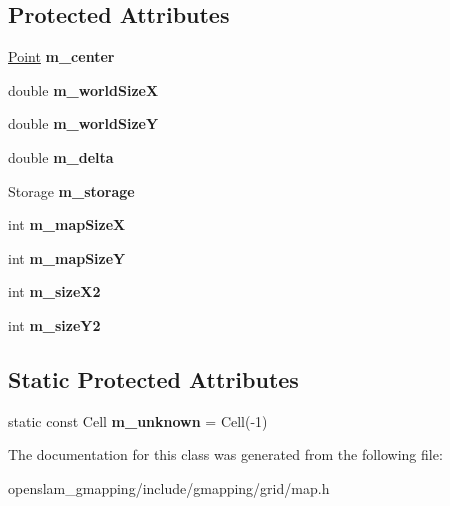 \subsection*{Protected Attributes}
\begin{DoxyCompactItemize}
\item 
\mbox{\label{classGMapping_1_1Map_aecd8d0eb5c8a5a8454c55e283934c5f0}} 
\hyperlink{structGMapping_1_1point}{Point} {\bfseries m\+\_\+center}
\item 
\mbox{\label{classGMapping_1_1Map_a10fdfaab06655e3a860b22a128b1e38b}} 
double {\bfseries m\+\_\+world\+SizeX}
\item 
\mbox{\label{classGMapping_1_1Map_a04515b99844c64b5467e262206fc1093}} 
double {\bfseries m\+\_\+world\+SizeY}
\item 
\mbox{\label{classGMapping_1_1Map_a2ff6f09bc5532cadc6ffbae79aad6016}} 
double {\bfseries m\+\_\+delta}
\item 
\mbox{\label{classGMapping_1_1Map_a485e3b3e595bad7e907939e6c1cd2d07}} 
Storage {\bfseries m\+\_\+storage}
\item 
\mbox{\label{classGMapping_1_1Map_a537a3f96ba5e7c8559789daf81162969}} 
int {\bfseries m\+\_\+map\+SizeX}
\item 
\mbox{\label{classGMapping_1_1Map_a96613b57751a8a4942f2988da41305d7}} 
int {\bfseries m\+\_\+map\+SizeY}
\item 
\mbox{\label{classGMapping_1_1Map_a573575e86b23cc139d4e4c1069e1cdbf}} 
int {\bfseries m\+\_\+size\+X2}
\item 
\mbox{\label{classGMapping_1_1Map_a107cabec8e4630a31fb11e5562543fb5}} 
int {\bfseries m\+\_\+size\+Y2}
\end{DoxyCompactItemize}
\subsection*{Static Protected Attributes}
\begin{DoxyCompactItemize}
\item 
\mbox{\label{classGMapping_1_1Map_aca2e12fc76363d004fe5bf403b72a6aa}} 
static const Cell {\bfseries m\+\_\+unknown} = Cell(-\/1)
\end{DoxyCompactItemize}


The documentation for this class was generated from the following file\+:\begin{DoxyCompactItemize}
\item 
openslam\+\_\+gmapping/include/gmapping/grid/map.\+h\end{DoxyCompactItemize}
